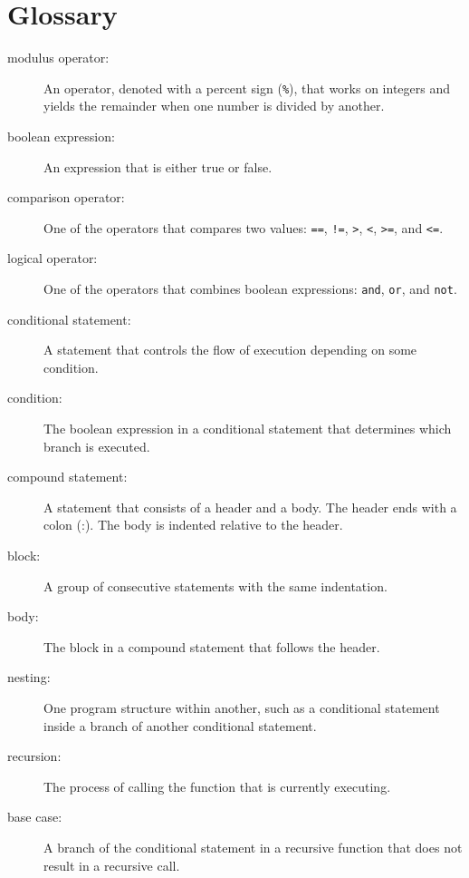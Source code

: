 \section{Glossary}

\begin{description}

\item[modulus operator:]  An operator, denoted with a percent sign
({\tt \%}), that works on integers and yields the remainder when one
number is divided by another.

\item[boolean expression:]  An expression that is either true or false.

\item[comparison operator:] One of the operators that compares two
values: {\tt ==}, {\tt !=}, {\tt >}, {\tt <}, {\tt >=}, and {\tt <=}.

\item[logical operator:] One of the operators that combines boolean
expressions: {\tt and}, {\tt or}, and {\tt not}.

\item[conditional statement:]  A statement that controls the flow of
execution depending on some condition.

\item[condition:] The boolean expression in a conditional statement
that determines which branch is executed.

\item[compound statement:]  A statement that consists of a header
and a body.  The header ends with a colon (:).  The body is indented
relative to the header.

\item[block:] A group of consecutive statements with the same
indentation.

\item[body:] The block in a compound statement that follows the
header.

\item[nesting:]  One program structure within another, such as a
conditional statement inside a branch of another conditional
statement.

\item[recursion:]  The process of calling the function that is
currently executing.

\item[base case:]  A branch of the conditional statement in a
recursive function that does not result in a recursive call.


\end{description}
